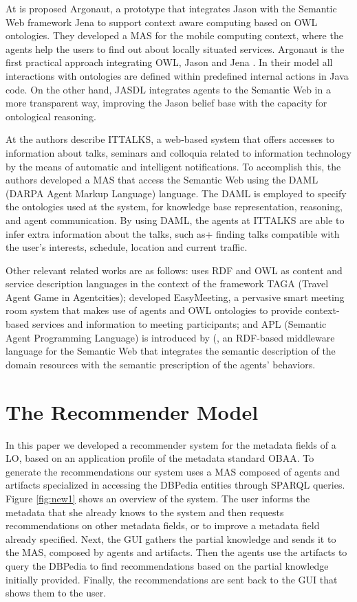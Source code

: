 \documentclass[a4paper,twoside]{article}
\begin{document}
At \cite{refC} is proposed Argonaut, a prototype that integrates Jason with the Semantic Web framework Jena to support context aware computing based on OWL ontologies. They developed a MAS for the mobile computing context, where the agents help the users to find out about locally situated services. Argonaut is the first practical approach integrating OWL, Jason and Jena \cite{refC}. In their model all interactions with ontologies are defined within predefined internal actions in Java code. On the other hand, JASDL integrates agents to the Semantic Web in a more transparent way, improving the Jason belief base with the capacity for ontological reasoning.

At \cite{refA} the authors describe ITTALKS, a web-based system that offers accesses to information about talks, seminars and colloquia related to information technology by the means of automatic and intelligent notifications. To accomplish this, the authors developed a MAS that access the Semantic Web using the DAML (DARPA Agent Markup Language) language. The DAML is employed to specify the ontologies used at the system, for knowledge base representation, reasoning, and agent communication. By using DAML, the agents at ITTALKS are able to infer extra information about the talks, such as+
 finding talks compatible with the user's interests, schedule, location and current traffic.

Other relevant related works are as follows: \cite{refD} uses RDF and OWL as content and service description languages in the context of the framework TAGA (Travel Agent Game in Agentcities); \cite{refE} developed EasyMeeting, a pervasive smart meeting room system that makes use of agents and OWL ontologies to provide context-based services and information to meeting participants; and 
APL (Semantic Agent Programming Language) is introduced by (\cite{refF}, an RDF-based middleware language for the Semantic Web that integrates the semantic description of the domain resources with the semantic prescription of the agents' behaviors.

\section{The Recommender Model}

\noindent In this paper we developed a recommender system for the metadata fields of a LO, based on an application profile of the metadata standard OBAA. To generate the recommendations our system uses a MAS composed of agents and artifacts specialized in accessing the DBPedia entities through SPARQL queries. Figure \ref{fig:new1} shows an overview of the system. The user informs the metadata that she already knows to the system and then requests recommendations on other metadata fields, or to improve a metadata field already specified. Next, the GUI gathers the partial knowledge and sends it to the MAS, composed by agents and artifacts. Then the agents use the artifacts to query the DBPedia to find recommendations based on the partial knowledge initially provided. Finally, the recommendations are sent back to the GUI that shows them to the user.
\end{document}
